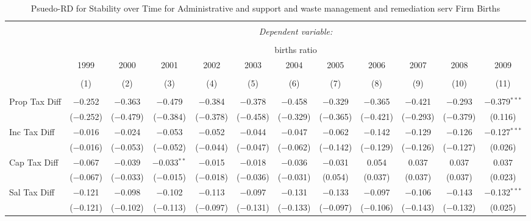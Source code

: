 
\begin{table}[!htbp] \centering 
  \caption{Psuedo-RD for Stability over Time for  Administrative and support and waste management and remediation serv Firm Births} 
  \label{56year} 
\small 
\begin{tabular}{@{\extracolsep{5pt}}lccccccccccc} 
\\[-1.8ex]\hline 
\hline \\[-1.8ex] 
 & \multicolumn{11}{c}{\textit{Dependent variable:}} \\ 
\cline{2-12} 
\\[-1.8ex] & \multicolumn{11}{c}{births ratio} \\ 
 & 1999 & 2000 & 2001 & 2002 & 2003 & 2004 & 2005 & 2006 & 2007 & 2008 & 2009 \\ 
\\[-1.8ex] & (1) & (2) & (3) & (4) & (5) & (6) & (7) & (8) & (9) & (10) & (11)\\ 
\hline \\[-1.8ex] 
 Prop Tax Diff & $-$0.252 & $-$0.363 & $-$0.479 & $-$0.384 & $-$0.378 & $-$0.458 & $-$0.329 & $-$0.365 & $-$0.421 & $-$0.293 & $-$0.379$^{***}$ \\ 
  & ($-$0.252) & ($-$0.479) & ($-$0.384) & ($-$0.378) & ($-$0.458) & ($-$0.329) & ($-$0.365) & ($-$0.421) & ($-$0.293) & ($-$0.379) & (0.116) \\ 
  Inc Tax Diff & $-$0.016 & $-$0.024 & $-$0.053 & $-$0.052 & $-$0.044 & $-$0.047 & $-$0.062 & $-$0.142 & $-$0.129 & $-$0.126 & $-$0.127$^{***}$ \\ 
  & ($-$0.016) & ($-$0.053) & ($-$0.052) & ($-$0.044) & ($-$0.047) & ($-$0.062) & ($-$0.142) & ($-$0.129) & ($-$0.126) & ($-$0.127) & (0.026) \\ 
  Cap Tax Diff & $-$0.067 & $-$0.039 & $-$0.033$^{**}$ & $-$0.015 & $-$0.018 & $-$0.036 & $-$0.031 & 0.054 & 0.037 & 0.037 & 0.037 \\ 
  & ($-$0.067) & ($-$0.033) & ($-$0.015) & ($-$0.018) & ($-$0.036) & ($-$0.031) & (0.054) & (0.037) & (0.037) & (0.037) & (0.023) \\ 
  Sal Tax Diff & $-$0.121 & $-$0.098 & $-$0.102 & $-$0.113 & $-$0.097 & $-$0.131 & $-$0.133 & $-$0.097 & $-$0.106 & $-$0.143 & $-$0.132$^{***}$ \\ 
  & ($-$0.121) & ($-$0.102) & ($-$0.113) & ($-$0.097) & ($-$0.131) & ($-$0.133) & ($-$0.097) & ($-$0.106) & ($-$0.143) & ($-$0.132) & (0.025) \\ 

\end{tabular}
\end{table}
